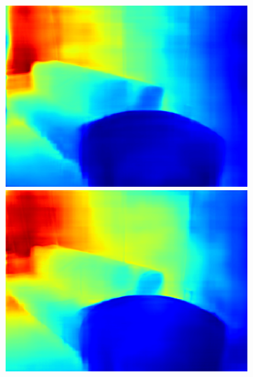 \begin{figure}[htb]
\begin{subfigure}{0.15\linewidth}
\begin{minipage}[t]{1\linewidth}
  \includegraphics[width=1\linewidth]{figure/nyu_result/living_room_rgb_01313.png}
  \includegraphics[width=1\linewidth]{figure/nyu_without/living_room_rgb_01313.png}
  \end{minipage}%
  \end{subfigure}
  \begin{subfigure}{0.15\linewidth}
    

\end{subfigure}
\end{figure}

